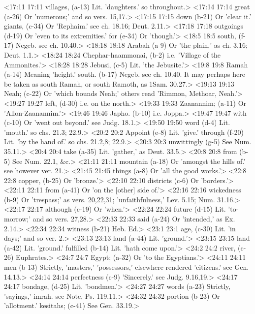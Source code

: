 <17:11 17:11  villages, (a-13)  Lit. 'daughters.' so throughout.>
<17:14 17:14  great (a-26)  Or 'numerous;' and so vers. 15,17.>
<17:15 17:15  down (b-21)  Or 'clear it.'
  giants, (c-34)  Or 'Rephaim.' see ch. 18.16; Deut. 2.11.>
<17:18 17:18  outgoings (d-19)  Or 'even to its extremities.'
  for (e-34)  Or 'though.'>
<18:5 18:5  south, (f-17)  Negeb. see ch. 10.40.>
<18:18 18:18  Arabah (a-9)  Or 'the plain,' as ch. 3.16; Deut. 1.1.>
<18:24 18:24  Chephar-haammonai, (b-2)  i.e. 'Village of the Ammonites.'>
<18:28 18:28  Jebusi, (c-5)  Lit. 'the Jebusite.'>
<19:8 19:8  Ramah (a-14)  Meaning 'height.'
  south. (b-17)  Negeb. see ch. 10.40. It may perhaps here be taken as south  Ramah, or south Ramoth, as 1Sam. 30.27.>
<19:13 19:13  Neah; (c-22)  Or 'which bounds Neah;' others read 'Rimmon, Methoar, Neah.'>
<19:27 19:27  left, (d-30)  i.e. on the north.>
<19:33 19:33  Zaanannim; (a-11)  Or 'Allon-Zaanannim.'>
<19:46 19:46  Japho. (b-10)  i.e. Joppa.>
<19:47 19:47  with (c-10)  Or 'went out beyond.' see Judg. 18.1.>
<19:50 19:50  word (d-4)  Lit. 'mouth.' so chs. 21.3; 22.9.>
<20:2 20:2  Appoint (e-8)  Lit. 'give.'
  through (f-20)  Lit. 'by the hand of.' so chs. 21.2,8; 22.9.>
<20:3 20:3  unwittingly (g-5)  See Num. 35.11.>
<20:4 20:4  take (a-35)  Lit. 'gather,' as Deut. 33.5.>
<20:8 20:8  from (b-5)  See Num. 22.1, &c.>
<21:11 21:11  mountain (a-18)  Or 'amongst the hills of.' see however ver. 21.>
<21:45 21:45  things (a-8)  Or 'all the good works.'>
<22:8 22:8  copper, (b-25)  Or 'bronze.'>
<22:10 22:10  districts (c-6)  Or 'borders.'>
<22:11 22:11  from (a-41)  Or 'on the [other] side of.'>
<22:16 22:16  wickedness (b-9)  Or 'trespass;' as vers. 20,22,31; 'unfaithfulness,' Lev.  5.15; Num. 31.16.>
<22:17 22:17  although (c-19)  Or 'when.'>
<22:24 22:24  future (d-15)  Lit. 'to-morrow;' and so vers. 27,28.>
<22:33 22:33  said (a-24)  Or 'intended,' as Ex. 2.14.>
<22:34 22:34  witness (b-21)  Heb. Ed.>
<23:1 23:1  age, (c-30)  Lit. 'in days;' and so ver. 2.>
<23:13 23:13  land (a-44) Lit. 'ground.'>
<23:15 23:15  land (a-42)  Lit. 'ground.'
  fulfilled (b-14)  Lit. 'hath come upon.'>
<24:2 24:2  river, (c-26)  Euphrates.>
<24:7 24:7  Egypt; (a-32)  Or 'to the Egyptians.'>
<24:11 24:11  men (b-13)  Strictly, 'masters,' 'possessors,' elsewhere rendered  'citizens.' see Gen. 14.13.>
<24:14 24:14  perfectness (c-9)  'Sincerely.' see Judg. 9.16,19.>
<24:17 24:17  bondage, (d-25)  Lit. 'bondmen.'>
<24:27 24:27  words (a-23)  Strictly, 'sayings,' imrah. see Note, Ps. 119.11.>
<24:32 24:32  portion (b-23)  Or 'allotment.'
  kesitahs; (c-41)  See Gen. 33.19.>
